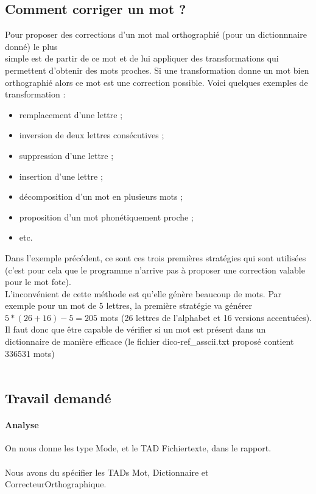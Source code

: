 \subsection{Comment corriger un mot ?}
Pour proposer des corrections d'un mot mal orthographié (pour un dictionnnaire donné) le plus\\simple est de partir de ce mot et de lui appliquer des transformations qui permettent d'obtenir des mots proches. Si une transformation donne un mot bien orthographié alors ce mot est une correction possible. Voici quelques exemples de transformation :
\begin{itemize}
\item remplacement d'une lettre ;
\item inversion de deux lettres consécutives ;
\item suppression d'une lettre ;
\item insertion d'une lettre ;
\item décomposition d'un mot en plusieurs mots ;
\item proposition d'un mot phonétiquement proche ;
\item etc.
\end{itemize}

Dans l'exemple précédent, ce sont ces trois premières stratégies qui sont utilisées (c'est pour cela que le programme n'arrive pas à proposer une correction valable pour le mot fote).\\
L'inconvénient de cette méthode est qu'elle génère beaucoup de mots. Par exemple pour un mot de 5 lettres, la première stratégie va générer $5 *(26 + 16) -5 = 205$ mots (26 lettres de l'alphabet et 16 versions accentuées). Il faut donc que être capable de vérifier si un mot est présent dans un dictionnaire de manière efficace (le fichier dico-ref\_asscii.txt proposé contient 336531 mots)\\
\\
\subsection{Travail demandé}
\paragraph{Analyse}
On nous donne les type Mode, et le TAD Fichiertexte, dans le rapport.\\
\\
Nous avons du spécifier les TADs Mot, Dictionnaire et CorrecteurOrthographique.\\
